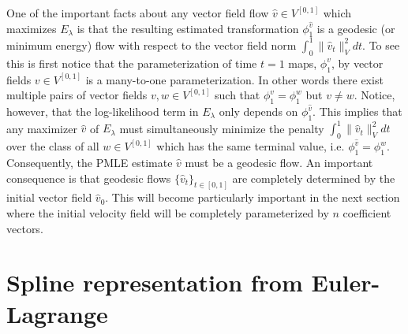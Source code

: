 \documentclass[noinfoline]{imsart}
\begin{document}


One of the important facts about any vector field flow $\hat v\in V^{[0,1]}$ which maximizes $E_\lambda$  is that the resulting estimated transformation  $\phi_1^{\hat v}$ is a geodesic (or minimum energy) flow with respect to the vector field norm $\int_0^1 \| \hat v_t\|^2_V dt$. To see this is first notice that the parameterization of time $t=1$ maps, $\phi_1^v$, by vector fields $v\in V^{[0,1]}$ is a many-to-one  parameterization. 
In other words there exist multiple pairs of vector fields $v,w\in V^{[0,1]}$ such that $\phi_1^v =\phi^w_1$ but $v\neq w$. Notice, however, that the log-likelihood term in $E_\lambda$ only depends on   $\phi_1^{\hat v}$. This implies that any maximizer $\hat v$ of $E_\lambda$ must simultaneously minimize  the penalty $\int_0^1 \| \hat v_t\|^2_V dt$ over the class of all $w\in V^{[0,1]}$ which has the same terminal value, i.e.\! $\phi^{\hat v}_1=\phi^w_1$.
 Consequently, the PMLE estimate $\hat v$ must be a geodesic flow. An important consequence  is that  geodesic flows $\{ \hat v_t \}_{t\in [0,1]}$ are completely determined by the initial vector field $\hat v_0$.  This will become particularly important in the next section where the initial velocity field will be completely parameterized by $n$ coefficient vectors.

%
%
%
%
\section{Spline representation from Euler-Lagrange}
\label{EL}
\end{document}
